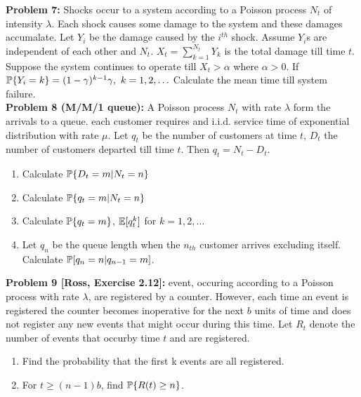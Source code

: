 \documentclass[a4paper,10pt,english]{article}
\begin{document}
\indent \textbf{Problem 7:} Shocks occur to a system according to a Poisson process $N_t$ of intensity $\lambda$. Each shock causes some damage to the system and these damages accumalate. Let $Y_i$ be the damage caused by the $i^{th}$ shock. Assume $Y_i$s are independent of each other and $N_t$. $X_t = \sum_{k=1}^{N_t} Y_k$ is the total damage till time $t$. Suppose the system continues to operate till $X_t > \alpha$ where $\alpha > 0$. If $\P\{Y_i = k\} = (1-\gamma)^{k-1}\gamma, \ k = 1,2,\ldots$ Calculate the mean time till system failure.  \\
\indent \textbf{Problem 8 (M/M/1 queue):} A Poisson process $N_t$ with rate $\lambda$ form the arrivals to a queue. each customer requires and i.i.d. service time of exponential distribution with rate $\mu$. Let $q_t$ be the number of customers at time $t$, $D_t$ the number of customers departed till time $t$. Then $q_t = N_t - D_t$. 
\begin{enumerate}
\item Calculate $\P\{D_t=m|N_t=n\}$
\item Calculate $\P\{q_t=m|N_t=n\}$
\item Calculate $\P\{q_t=m\}$, $\E[q_t^k]$ for $k=1,2,\ldots$
\item Let $q_n$ be the queue length when the $n_{th}$ customer arrives excluding itself. Calculate $\P[q_n = n|q_{n-1} = m]$.
\end{enumerate}

\indent \textbf{Problem 9 [Ross, Exercise 2.12]:} event, occuring according to a Poisson process with rate $\lambda$, are registered by a counter. However, each time an event is registered the counter becomes inoperative for the next $b$ units of time and does not register any new events that might occur during this time. Let $R_t$ denote the number of events that occurby time $t$ and are registered. 
\begin{enumerate}
\item Find the probability that the first k events are all registered.
\item For $t \geq (n-1)b$, find $\P\{R(t) \geq n\}$.
\end{enumerate}
\end{document}
